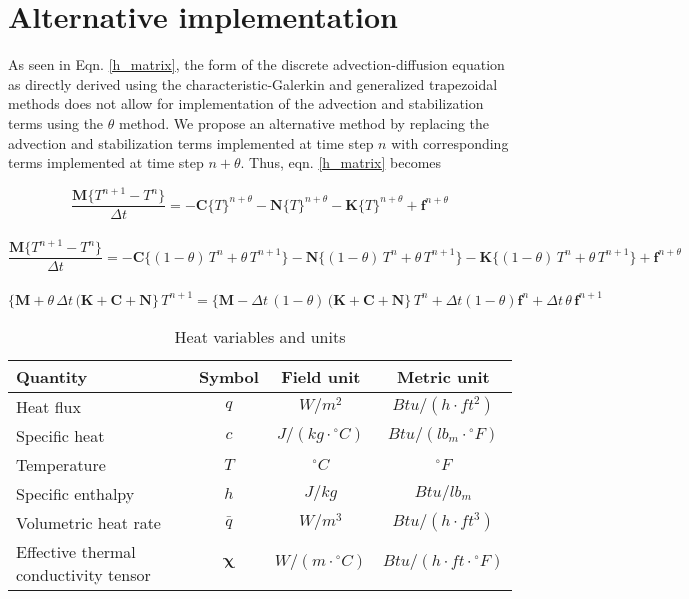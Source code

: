 \section{Alternative implementation}
As seen in Eqn. \ref{h_matrix}, the form of the discrete advection-diffusion equation as directly derived using the characteristic-Galerkin and generalized trapezoidal methods does not allow for implementation of the advection and stabilization terms using the $\theta$ method. We propose an alternative method by replacing the advection and stabilization terms implemented at time step $n$ with corresponding terms implemented at time step $n+\theta$. Thus, eqn. \ref{h_matrix} becomes

\begin{equation}	
\frac{\mathbf{M}\{T^{n+1}-T^n\}}{\Delta t}=-\mathbf{C}\{T\}^{n+\theta}-\mathbf{N}\{T\}^{n+\theta} -\mathbf{K}\{T\}^{n+\theta}+\mathbf{f}^{n+\theta}
\end{equation}
\\
%
\begin{equation}	
\frac{\mathbf{M}\{T^{n+1}-T^n\}}{\Delta t}=-\mathbf{C}\{(1-\theta)\,T^n+\theta \, T^{n+1} \}-\mathbf{N}\{(1-\theta)\,T^n+\theta \, T^{n+1} \} -\mathbf{K}\{(1-\theta)\,T^n+\theta \, T^{n+1} \}+\mathbf{f}^{n+\theta}
\end{equation}
%
\\
\begin{equation}	
\{\mathbf{M}+\theta\,\Delta t\,(\mathbf{K}+\mathbf{C}+\mathbf{N}\}\, T^{n+1}=\{\mathbf{M}-\Delta t\,(1-\theta)\,(\mathbf{K}+\mathbf{C}+\mathbf{N}\}\, T^{n} +\Delta t(1-\theta)\mathbf{f}^n +\Delta t\,\theta\,\mathbf{f}^{n+1}
\end{equation}


\newpage
\begin{center}
\begin{table}
\caption[Heat variables and units]{Heat variables and units}\label{heat_vtable}
\begin{center}
\begin{tabular}{lccc}
\toprule
\textbf{Quantity} & Symbol & Field unit & Metric unit 		\\
\toprule
Heat flux & $q$ & $W/m^{2}$ & $Btu/ (h \cdot ft^2)$	\\
Specific heat & $c$ & $J/(kg\cdot {}^\circ C)$ & $Btu/(lb_m\cdot {}^\circ F)$	\\
Temperature & $T$ & ${}^\circ C$& ${}^\circ F$	\\
Specific enthalpy & $h$ & $J/kg$ & $Btu/lb_m$			\\
Volumetric heat rate & $\bar{q}$ & $W/m^{3}$ & $Btu/ (h \cdot ft^3)$	\\
Effective thermal conductivity tensor & $\mathbf{\chi}$ & $W/ (m \cdot {}^\circ C)$ & $Btu/ (h \cdot ft\cdot {}^\circ F)$ 	\\
\bottomrule
\end{tabular}
\end{center}
\end{table}
\end{center}




